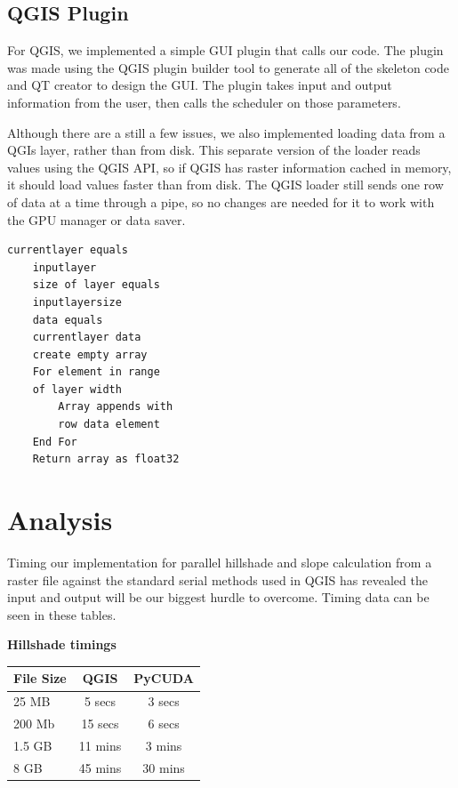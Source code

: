 \documentclass[journal]{IEEEtran}
\begin{document}
    \subsection{QGIS Plugin}
    For QGIS, we implemented a simple GUI plugin that calls our code. The plugin
    was made using the QGIS plugin builder tool to generate all of the skeleton
    code and QT creator to design the GUI. The plugin takes input and output
    information from the user, then calls the scheduler on those parameters.

    Although there are a still a few issues, we also implemented loading data
    from a QGIs layer, rather than from disk. This separate version of the loader
    reads values using the QGIS API, so if QGIS has raster information cached in
    memory, it should load values faster than from disk. The QGIS loader still
    sends one row of data at a time through a pipe, so no changes are needed
    for it to work with the GPU manager or data saver.

\begin{Verbatim}[frame=single, gobble=7]
	currentlayer equals 
	inputlayer
	size of layer equals 
	inputlayersize
	data equals 
	currentlayer data
	create empty array
	For element in range 
	of layer width
		Array appends with 
		row data element
	End For
	Return array as float32 
\end{Verbatim}
    
\section{Analysis}
Timing our implementation for parallel hillshade and slope calculation from a raster file
against the standard serial methods used in QGIS has revealed the input and
output will be our biggest hurdle to overcome. Timing data can be seen in these
tables.

\vspace{.25in}
\pagebreak
\textbf{Hillshade timings}
\vspace{0.05in}

\begin{tabular}{ l | c | c }
    File Size & QGIS   & PyCUDA\\ \hline
    25 MB     & 5 secs & 3 secs\\ \hline
    200 Mb    & 15 secs & 6 secs\\ \hline
    1.5 GB    & 11 mins & 3 mins\\ \hline
    8 GB      & 45 mins & 30 mins
\end {tabular}
\end{document}

